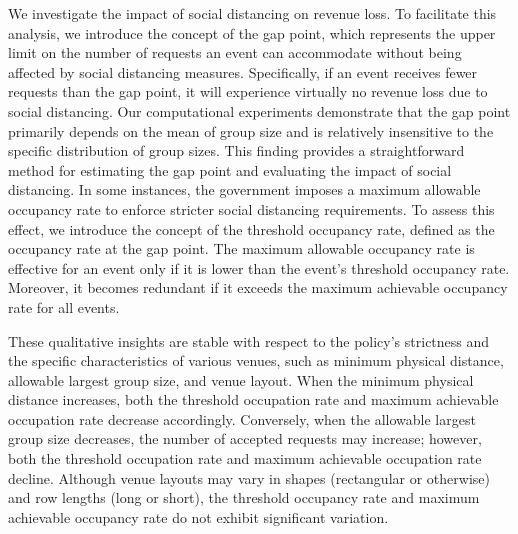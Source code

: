 
We investigate the impact of social distancing on revenue loss. To facilitate this analysis, we introduce the concept of the gap point, which represents the upper limit on the number of requests an event can accommodate without being affected by social distancing measures. Specifically, if an event receives fewer requests than the gap point, it will experience virtually no revenue loss due to social distancing. Our computational experiments demonstrate that the gap point primarily depends on the mean of group size and is relatively insensitive to the specific distribution of group sizes. This finding provides a straightforward method for estimating the gap point and evaluating the impact of social distancing.
In some instances, the government imposes a maximum allowable occupancy rate to enforce stricter social distancing requirements. To assess this effect, we introduce the concept of the threshold occupancy rate, defined as the occupancy rate at the gap point. The maximum allowable occupancy rate is effective for an event only if it is lower than the event's threshold occupancy rate. Moreover, it becomes redundant if it exceeds the maximum achievable occupancy rate for all events.





These qualitative insights are stable with respect to the policy's strictness and the specific characteristics of various venues, such as minimum physical distance, allowable largest group size, and venue layout. When the minimum physical distance increases, both the threshold occupation rate and maximum achievable occupation rate decrease accordingly. Conversely, when the allowable largest group size decreases, the number of accepted requests may increase; however, both the threshold occupation rate and maximum achievable occupation rate decline. Although venue layouts may vary in shapes (rectangular or otherwise) and row lengths (long or short), the threshold occupancy rate and maximum achievable occupancy rate do not exhibit significant variation.



